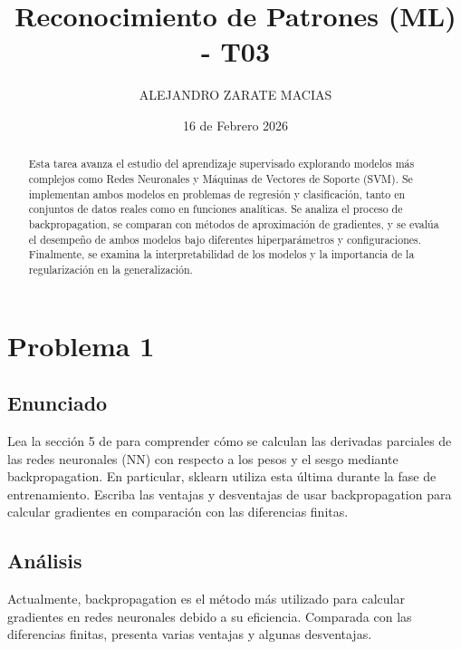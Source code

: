 \documentclass{article}
\title{Reconocimiento de Patrones (ML) - T03}
\author{ALEJANDRO ZARATE MACIAS}
\date{16 de Febrero 2026}
\begin{document}
\maketitle

\begin{abstract}
Esta tarea avanza el estudio del aprendizaje supervisado explorando modelos más complejos como Redes Neuronales y Máquinas de Vectores de Soporte (SVM). Se implementan ambos modelos en problemas de regresión y clasificación, tanto en conjuntos de datos reales como en funciones analíticas. Se analiza el proceso de backpropagation, se comparan con métodos de aproximación de gradientes, y se evalúa el desempeño de ambos modelos bajo diferentes hiperparámetros y configuraciones. Finalmente, se examina la interpretabilidad de los modelos y la importancia de la regularización en la generalización.
\end{abstract}

\section{Problema 1}

\subsection{Enunciado}

Lea la sección 5 de \cite{higham2018deeplearningintroductionapplied} para comprender cómo se calculan las derivadas parciales de las redes neuronales (NN) con respecto a los pesos y el sesgo mediante backpropagation. En particular, sklearn utiliza esta última durante la fase de entrenamiento. Escriba las ventajas y desventajas de usar backpropagation para calcular gradientes en comparación con las diferencias finitas.

\subsection{Análisis}

Actualmente, backpropagation es el método más utilizado para calcular gradientes en redes neuronales debido a su eficiencia. Comparada con las diferencias finitas, presenta varias ventajas y algunas desventajas.
\end{document}
